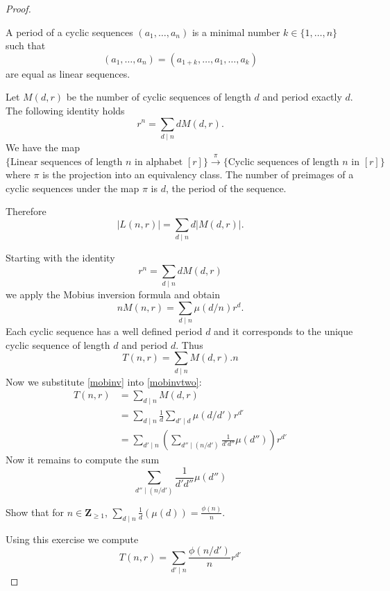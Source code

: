 \begin{proof}
\begin{definition}
A period of a cyclic sequences $(a_{1},\dots,a_{n})$ is a minimal number $k\in \{ 1,\dots,n \}$ such that
$$
(a_{1},\dots,a_{n})=(a_{1+k},\dots,a_{1},\dots,a_{k})
$$
are equal as linear sequences.
\end{definition}
Let $M(d,r)$ be the number of cyclic sequences of length $d$ and period exactly $d$. The following identity holds
$$
r^{n}=\sum _{d\mid n}d M(d,r).
$$
We have the map
$$
\{ \text{Linear sequences of length }n\text{ in alphabet } [r]  \}\overset{\pi}\to \{ \text{Cyclic sequences of length }n\text{ in } [r] \}
$$
where $\pi$ is the projection into an equivalency class. The number of preimages of a cyclic sequences under the map $\pi$ is $d$, the period of the sequence.

Therefore
$$
|L(n,r)|=\sum _{d\mid n}d|M(d,r)|.
$$


Starting with the identity 
$$
r^{n}=\sum _{d\mid n} dM(d,r)
$$
we apply the Mobius inversion formula and obtain
\begin{equation}
nM(n,r)=\sum _{d\mid n}\mu(d/n)r^{d}. \label{mobinv}
\end{equation}
Each cyclic sequence has a well defined period $d$ and it corresponds to the unique cyclic sequence of length $d$ and period $d$. Thus
\begin{equation}
T(n,r)=\sum _{d\mid n}M(d,r).n \label{mobinvtwo}
\end{equation}
Now we substitute \ref{mobinv} into \ref{mobinvtwo}:
\begin{align*}
T(n,r) & =\sum _{d\mid n}M(d,r) \\
 & =\sum _{d\mid n} \frac{1}{d}\sum _{d'\mid d}\mu(d/d')r^{d'} \\
 & =\sum _{d'\mid n}\left( \sum _{d''\mid (n/d')} \frac{1}{d'd''} \mu(d'')  \right)r^{d'}
\end{align*}
Now it remains to compute the sum
$$
\sum _{d''\mid (n/d')} \frac{1}{d'd''} \mu(d'')
$$
\begin{exercise}
Show that for $n\in \mathbf{Z}_{\ge 1}$, $\sum _{d\mid n} \frac{1}{d}(\mu(d))=\frac{\phi(n)}{n}$.
\end{exercise}
Using this exercise we compute
$$
T(n,r)=\sum _{d'\mid n} \frac{\phi(n/d')}{n}r^{d'}
$$
\end{proof}

